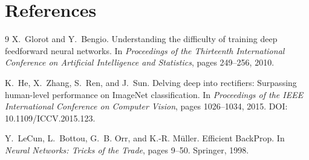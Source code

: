 \documentclass[11pt]{article}
\begin{document}
\section{References}
\label{sec:references}

\begin{thebibliography}{9}
X.~Glorot and Y.~Bengio.
\newblock Understanding the difficulty of training deep feedforward neural networks.
\newblock In \emph{Proceedings of the Thirteenth International Conference on Artificial Intelligence and Statistics}, pages 249--256, 2010.

K.~He, X.~Zhang, S.~Ren, and J.~Sun.
\newblock Delving deep into rectifiers: Surpassing human-level performance on ImageNet classification.
\newblock In \emph{Proceedings of the IEEE International Conference on Computer Vision}, pages 1026--1034, 2015.
\newblock DOI: 10.1109/ICCV.2015.123.

Y.~LeCun, L.~Bottou, G.~B. Orr, and K.-R. M{\"u}ller.
\newblock Efficient BackProp.
\newblock In \emph{Neural Networks: Tricks of the Trade}, pages 9--50. Springer, 1998.
\end{thebibliography}
\end{document}
